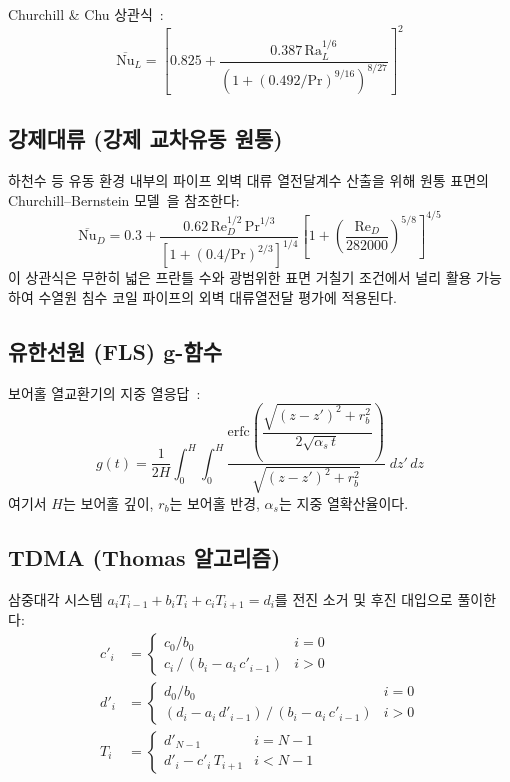 Churchill \& Chu 상관식~\cite{churchill1975}:
\begin{equation}\label{eq:churchill-chu}
  \overline{\text{Nu}}_L = \left[0.825 + \frac{0.387\,\text{Ra}_L^{1/6}}{\left(1 + (0.492/\text{Pr})^{9/16}\right)^{8/27}}\right]^2
\end{equation}

\subsection{강제대류 (강제 교차유동 원통)}

하천수 등 유동 환경 내부의 파이프 외벽 대류 열전달계수 산출을 위해 원통 표면의 Churchill--Bernstein 모델~\cite{churchill1977}을 참조한다:
\begin{equation}\label{eq:churchill-bernstein}
  \overline{\text{Nu}}_D = 0.3 + \frac{0.62\,\text{Re}_D^{1/2}\,\text{Pr}^{1/3}}{\left[ 1 + (0.4/\text{Pr})^{2/3} \right]^{1/4}} \left[ 1 + \left( \frac{\text{Re}_D}{282000} \right)^{5/8} \right]^{4/5}
\end{equation}
이 상관식은 무한히 넓은 프란틀 수와 광범위한 표면 거칠기 조건에서 널리 활용 가능하여 수열원 침수 코일 파이프의 외벽 대류열전달 평가에 적용된다.

\subsection{유한선원 (FLS) g-함수}

보어홀 열교환기의 지중 열응답~\cite{eskilson1987}:
\begin{equation}\label{eq:fls-g}
  g(t) = \frac{1}{2H}\int_0^H \int_0^H
    \frac{\text{erfc}\!\left(\dfrac{\sqrt{(z-z')^2 + r_b^2}}{2\sqrt{\alpha_s\,t}}\right)}{\sqrt{(z-z')^2 + r_b^2}}\;dz'\,dz
\end{equation}
여기서 $H$는 보어홀 깊이, $r_b$는 보어홀 반경, $\alpha_s$는 지중 열확산율이다.

\subsection{TDMA (Thomas 알고리즘)}

삼중대각 시스템 $a_i T_{i-1} + b_i T_i + c_i T_{i+1} = d_i$를 전진 소거 및 후진 대입으로 풀이한다:
\begin{align}
  c'_i &= \begin{cases} c_0/b_0 & i = 0 \\ c_i\,/\,(b_i - a_i\,c'_{i-1}) & i > 0 \end{cases} \label{eq:tdma-c}\\
  d'_i &= \begin{cases} d_0/b_0 & i = 0 \\ (d_i - a_i\,d'_{i-1})\,/\,(b_i - a_i\,c'_{i-1}) & i > 0 \end{cases} \label{eq:tdma-d}\\
  T_i  &= \begin{cases} d'_{N-1} & i = N-1 \\ d'_i - c'_i\,T_{i+1} & i < N-1 \end{cases} \label{eq:tdma-T}
\end{align}
